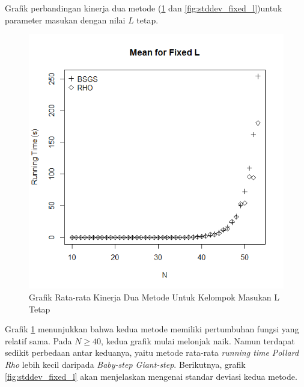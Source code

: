 Grafik perbandingan kinerja dua metode (\ref{fig:mean_fixed_l} dan \ref{fig:stddev_fixed_l})untuk parameter masukan dengan nilai $ L $ tetap.

\begin{figure}[h!]
	\Centering
	\includegraphics[angle=0, scale=0.55]{bab5/img/mean-fixed-l}
	\caption{Grafik Rata-rata Kinerja Dua Metode Untuk Kelompok Masukan L Tetap}
	\label{fig:mean_fixed_l}
\end{figure}

Grafik \ref{fig:mean_fixed_l} menunjukkan bahwa kedua metode memiliki pertumbuhan fungsi yang relatif sama. Pada $ N \geq 40 $, kedua grafik mulai melonjak naik. Namun terdapat sedikit perbedaan antar keduanya, yaitu metode rata-rata \textit{running time} \textit{Pollard Rho} lebih kecil daripada \textit{Baby-step Giant-step}. Berikutnya, grafik \ref{fig:stddev_fixed_l} akan menjelaskan mengenai standar deviasi kedua metode.

